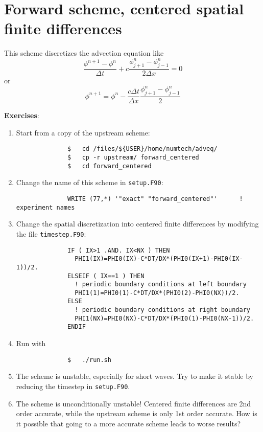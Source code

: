 \documentclass[a4paper]{article}
\begin{document}
\section{Forward scheme, centered spatial finite differences}
%
\par
This scheme discretizes the advection equation like
%
\begin{equation*}
	\frac{\phi^{n+1}-\phi^{n}}{\Delta t}+c\frac{\phi^{n}_{j+1}-\phi^{n}_{j-1}}{2\Delta x}=0
\end{equation*}
%
or
%
\begin{equation*}
	\phi^{n+1}=\phi^{n}-\frac{c\Delta t}{\Delta x}\frac{\phi^{n}_{j+1}-\phi^{n}_{j-1}}{2}
\end{equation*}
%
\par\vspace*{3ex}
\textbf{Exercises}:
%
\begin{enumerate}
	\item Start from a copy of the upstream scheme:
		\begin{verbatim}
			  $   cd /files/${USER}/home/numtech/adveq/
			  $   cp -r upstream/ forward_centered
			  $   cd forward_centered
		\end{verbatim}
	\item Change the name of this scheme in \verb+setup.F90+:
		\begin{verbatim}
			  WRITE (77,*) '"exact" "forward_centered"'      ! experiment names
		\end{verbatim}
	\item Change the spatial discretization into centered finite differences by modifying the file \verb+timestep.F90+:
		\begin{verbatim}
			  IF ( IX>1 .AND. IX<NX ) THEN
			    PHI1(IX)=PHI0(IX)-C*DT/DX*(PHI0(IX+1)-PHI0(IX-1))/2.
			  ELSEIF ( IX==1 ) THEN
			    ! periodic boundary conditions at left boundary
			    PHI1(1)=PHI0(1)-C*DT/DX*(PHI0(2)-PHI0(NX))/2.
			  ELSE
			    ! periodic boundary conditions at right boundary
			    PHI1(NX)=PHI0(NX)-C*DT/DX*(PHI0(1)-PHI0(NX-1))/2.
			  ENDIF		
		\end{verbatim}
	\item Run with
		\begin{verbatim}
			  $   ./run.sh
		\end{verbatim}
	\item The scheme is unstable, especially for short waves. Try to make it stable by reducing the timestep in \verb+setup.F90+.
	\item The scheme is unconditionally unstable! Centered finite differences are 2nd order accurate, while the upstream scheme is only 1st order accurate. How is it possible that going to a more accurate scheme leads to worse results?
\end{enumerate}
%
\end{document}
